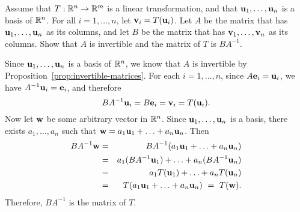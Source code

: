 \begin{ex}\label{ex:linear-transformation-inconvenient}
  Assume that $T:\mathbb{R}^n\rightarrow \mathbb{R}^m$ is a linear transformation,
  and that $\vect{u}_1,\ldots,\vect{u}_n$ is a basis of $\mathbb{R}^n$. For
  all $i=1,\ldots,n$, let $\vect{v}_i = T(\vect{u}_i)$. Let $A$ be the
  matrix that has $\vect{u}_1,\ldots,\vect{u}_n$ as its columns, and
  let $B$ be the matrix that has $\vect{v}_1,\ldots,\vect{v}_n$ as its
  columns. Show that $A$ is invertible and the matrix of $T$ is
  $BA^{-1}$.
  \begin{sol}
    Since $\vect{u}_1,\ldots,\vect{u}_n$ is a basis of $\mathbb{R}^n$, we know
    that $A$ is invertible by  Proposition~\ref{prop:invertible-matrices}.
    For each $i=1,\ldots,n$, since $A\vect{e}_i = \vect{u}_i$, we have
    $A^{-1}\vect{u}_i=\vect{e}_i$, and therefore
    \begin{equation*}
      BA^{-1}\vect{u}_i = B\vect{e}_i = \vect{v}_i = T(\vect{u}_i).
    \end{equation*}
    Now let $\vect{w}$ be some arbitrary vector in $\mathbb{R}^n$. Since
    $\vect{u}_1,\ldots,\vect{u}_n$ is a basis, there exists
    $a_1,\ldots,a_n$ such that $\vect{w} =
    a_1\vect{u}_1+\ldots+a_n\vect{u}_n$. Then
    \begin{eqnarray*}
      BA^{-1}\vect{w}
      &=& BA^{-1}(a_1\vect{u}_1+\ldots+a_n\vect{u}_n) \\
      &=& a_1(BA^{-1}\vect{u}_1) + \ldots + a_n(BA^{-1}\vect{u}_n) \\
      &=& a_1T(\vect{u}_1) + \ldots + a_nT(\vect{u}_n) \\
      &=& T(a_1\vect{u}_1+\ldots+a_n\vect{u}_n) ~=~ T(\vect{w}).
    \end{eqnarray*}
    Therefore, $BA^{-1}$ is the matrix of $T$.
  \end{sol}
\end{ex}

